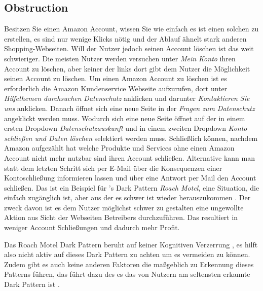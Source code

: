 \documentclass[conference,compsoc,final,a4paper]{IEEEtran}
\begin{document}
\subsection{Obstruction}
\label{chap:Obstruction}
Besitzen Sie einen Amazon Account, wissen Sie wie einfach es ist einen solchen zu erstellen, es sind nur wenige Klicks nötig und der Ablauf ähnelt stark anderen Shopping-Webseiten. Will der Nutzer jedoch seinen Account löschen ist das weit schwieriger. Die meisten Nutzer werden versuchen unter \textit{Mein Konto} ihren Account zu löschen, aber keiner der links dort gibt dem Nutzer die Möglichkeit seinen Account zu löschen. Um einen Amazon Account zu löschen ist es erforderlich die Amazon Kundenservice Webseite aufzurufen, dort unter \textit{Hilfethemen durchsuchen} \textit{Datenschutz} anklicken und darunter \textit{Kontaktieren Sie uns} anklicken. Danach öffnet sich eine neue Seite in der \textit{Fragen zum Datenschutz} angeklickt werden muss. Wodurch sich eine neue Seite öffnet auf der in einem ersten Dropdown \textit{Datenschutzauskunft} und in einem zweiten Dropdown \textit{Konto schließen und Daten löschen} selektiert werden muss. Schließlich können, nachdem Amazon aufgezählt hat welche Produkte und Services ohne einen Amazon Account nicht mehr nutzbar sind ihren Account schließen. Alternative kann man statt dem letzten Schritt sich per E-Mail über die Konsequenzen einer Kontoschließung informieren lassen und über eine Antwort per Mail den Account schließen. Das ist ein Beispiel für \citeauthor{Brignull}'s Dark Pattern \textit{Roach Motel}, eine Situation, die einfach zugänglich ist, aber aus der es schwer ist wieder herauszukommen \autocite{Brignull}. Der zweck davon ist es dem Nutzer möglichst schwer zu gestalten eine ungewollte Aktion aus Sicht der Webseiten Betreibers durchzuführen. Das resultiert in weniger Account Schließungen und dadurch mehr Profit.

Das Roach Motel Dark Pattern beruht auf keiner Kognitiven Verzerrung \autocite{Mathur2019}, es hilft also nicht aktiv auf dieses Dark Pattern zu achten um es vermeiden zu können. Zudem gibt es auch keine anderen Faktoren die maßgeblich zu Erkennung dieses Patterns führen, das führt dazu des es das von Nutzern am seltensten erkannte Dark Pattern ist \autocite{M.Bhoot2020}.

\end{document}

